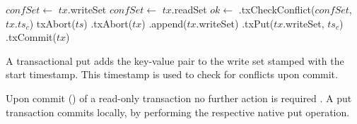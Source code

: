 \begin{algorithm} [t]
\begin{algorithmic}[1]
		\State $confSet \gets $ $tx$.writeSet  \label{line:dbwritekeys} 
	\EndIf
		\State $confSet \gets $ $tx$.readSet  \label{line:dbreadkeys}
	\EndIf 
	\State $ok \gets$ \dbserver.txCheckConflict($confSet$, $tx.ts_{c}$) \label{line:checknat}
		\State txAbort($ts$) \label{line:abortdb}
	 	\State \medserver.txAbort($tx$) \label{line:abort}
		\State \Return {} \label{line:negdb}
	\EndIf
	\State \Return {} \label{line:trycommitok}
\EndFunction
\vspace{7pt}
	\State \logger.append($tx$.writeSet)  \label{line:wal}
	\State \dbserver.txPut($tx$.writeSet, $ts_{c}$)  \label{line:batch}
	\State \medserver.txCommit($tx$) \label{line:commit}
\EndFunction

\end{algorithmic}
\end{algorithm}

A transactional put adds the key-value pair to the write
set stamped with the start timestamp.
This timestamp is used to check for conflicts upon commit.

Upon commit () of a read-only transaction no further action
is required%
. %
A put transaction commits locally, by performing the respective native put
operation.

